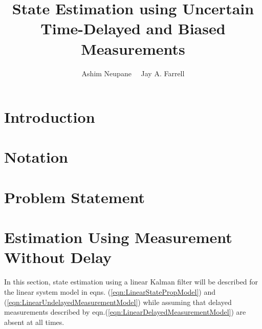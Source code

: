 
\usepackage{tikz}
\usepackage{wrapfig}
\usepackage{caption}
\usepackage{stfloats}
\DeclareMathAlphabet{}


\title{State Estimation using Uncertain Time-Delayed and Biased Measurements}
\author{Ashim Neupane \ \ Jay A. Farrell
}%

\maketitle

		
\section{Introduction}	
	
	
\section{Notation}	\label{sect:notation}
	

\section{Problem Statement}\label{sect:problem_statement}
	

\section{Estimation Using Measurement Without Delay} \label{sect:estimation_no_delayed_msr}
	In this section, state estimation using a linear Kalman filter will be described for the linear system model in eqns. (\ref{eqn:LinearStatePropModel}) and (\ref{eqn:LinearUndelayedMeasurementModel}) while assuming that delayed measurements described by eqn.(\ref{eqn:LinearDelayedMeasurementModel}) are absent at all times.\\
		
%	
%	

